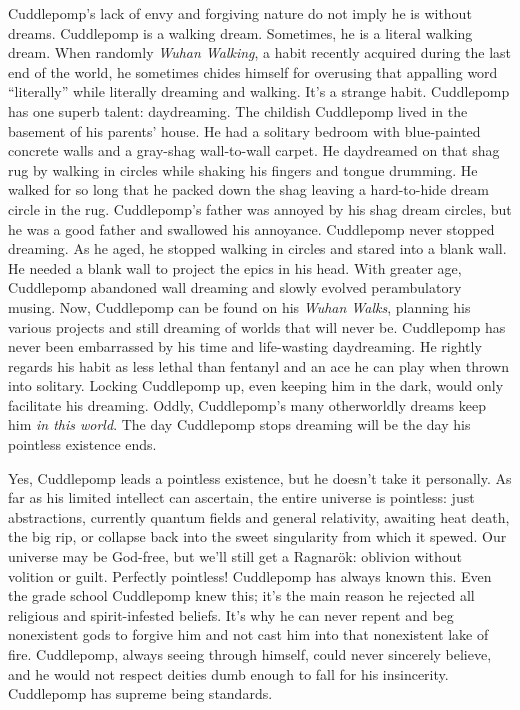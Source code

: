 Cuddlepomp's lack of envy and forgiving nature do not imply he is
without dreams. Cuddlepomp is a walking dream. Sometimes, he is a
literal walking dream. When randomly \emph{Wuhan Walking}, a habit
recently acquired during the last end of the world, he sometimes chides
himself for overusing that appalling word ``literally'' while literally
dreaming and walking. It's a strange habit. Cuddlepomp has one superb
talent: daydreaming. The childish Cuddlepomp lived in the basement of
his parents' house. He had a solitary bedroom with blue-painted concrete
walls and a gray-shag wall-to-wall carpet. He daydreamed on that shag
rug by walking in circles while shaking his fingers and tongue drumming.
He walked for so long that he packed down the shag leaving a
hard-to-hide dream circle in the rug. Cuddlepomp's father was annoyed by
his shag dream circles, but he was a good father and swallowed his
annoyance. Cuddlepomp never stopped dreaming. As he aged, he stopped
walking in circles and stared into a blank wall. He needed a blank wall
to project the epics in his head. With greater age, Cuddlepomp abandoned
wall dreaming and slowly evolved perambulatory musing. Now, Cuddlepomp
can be found on his \emph{Wuhan Walks}, planning his various projects
and still dreaming of worlds that will never be. Cuddlepomp has never
been embarrassed by his time and life-wasting daydreaming. He rightly
regards his habit as less lethal than fentanyl and an ace he can play
when thrown into solitary. Locking Cuddlepomp up, even keeping him in
the dark, would only facilitate his dreaming. Oddly, Cuddlepomp's many
otherworldly dreams keep him \emph{in this world}. The day Cuddlepomp
stops dreaming will be the day his pointless existence ends.

Yes, Cuddlepomp leads a pointless existence, but he doesn't take it
personally. As far as his limited intellect can ascertain, the entire
universe is pointless: just abstractions, currently quantum fields and
general relativity, awaiting heat death, the big rip, or collapse back
into the sweet singularity from which it spewed. Our universe may be
God-free, but we'll still get a Ragnarök: oblivion without volition or
guilt. Perfectly pointless! Cuddlepomp has always known this. Even the
grade school Cuddlepomp knew this; it's the main reason he rejected all
religious and spirit-infested beliefs. It's why he can never repent and
beg nonexistent gods to forgive him and not cast him into that
nonexistent lake of fire. Cuddlepomp, always seeing through himself,
could never sincerely believe, and he would not respect deities dumb
enough to fall for his insincerity. Cuddlepomp has supreme being
standards.

